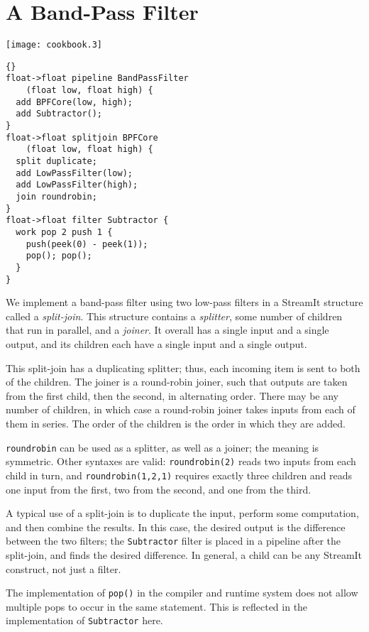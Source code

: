 \section{A Band-Pass Filter}

\begin{textpic}{\texttt{[image: cookbook.3]}}
\begin{lstlisting}{}
float->float pipeline BandPassFilter
    (float low, float high) {
  add BPFCore(low, high);
  add Subtractor();
}
float->float splitjoin BPFCore
    (float low, float high) {
  split duplicate;
  add LowPassFilter(low);
  add LowPassFilter(high);
  join roundrobin;
}
float->float filter Subtractor {
  work pop 2 push 1 {
    push(peek(0) - peek(1));
    pop(); pop();
  }
}
\end{lstlisting}
\end{textpic}

We implement a band-pass filter using two low-pass filters in a
StreamIt structure called a \emph{split-join}.  This structure
contains a \emph{splitter}, some number of children that run in
parallel, and a \emph{joiner}.  It overall has a single input and a
single output, and its children each have a single input and a single
output.

This split-join has a duplicating splitter; thus, each incoming item
is sent to both of the children.  The joiner is a round-robin joiner,
such that outputs are taken from the first child, then the second, in
alternating order.  There may be any number of children, in which case
a round-robin joiner takes inputs from each of them in series.  The
order of the children is the order in which they are added.

\lstinline|roundrobin| can be used as a splitter, as well as a joiner;
the meaning is symmetric.  Other syntaxes are valid:
\lstinline|roundrobin(2)| reads two inputs from each child in turn,
and \lstinline|roundrobin(1,2,1)| requires exactly three children and
reads one input from the first, two from the second, and one from the
third.

A typical use of a split-join is to duplicate the input, perform some
computation, and then combine the results.  In this case, the desired
output is the difference between the two filters; the
\lstinline|Subtractor| filter is placed in a pipeline after the
split-join, and finds the desired difference.  In general, a child can
be any StreamIt construct, not just a filter.

The implementation of \lstinline|pop()| in the compiler and runtime
system does not allow multiple pops to occur in the same statement.
This is reflected in the implementation of \lstinline|Subtractor|
here.